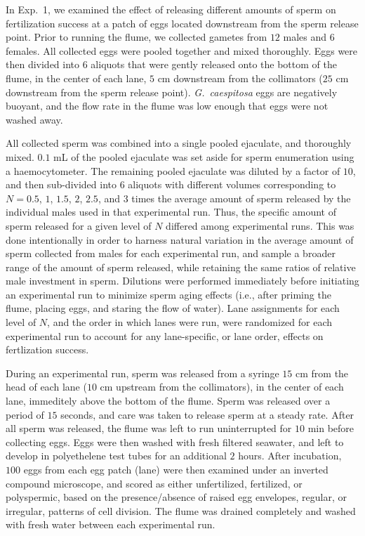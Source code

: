 \documentclass{article}
\begin{document}
	In Exp.~1, we examined the effect of releasing different amounts of sperm on fertilization success at a patch of eggs located downstream from the sperm release point. Prior to running the flume, we collected gametes from $12$ males and $6$ females. All collected eggs were pooled together and mixed thoroughly. Eggs were then divided into $6$ aliquots that were gently released onto the bottom of the flume, in the center of each lane, $5$ cm downstream from the collimators ($25$ cm downstream from the sperm release point). \textit{G.~caespitosa} eggs are negatively buoyant, and the flow rate in the flume was low enough that eggs were not washed away. 

	All collected sperm was combined into a single pooled ejaculate, and thoroughly mixed. $0.1$ mL of the pooled ejaculate was set aside for sperm enumeration using a haemocytometer. The remaining pooled ejaculate was diluted by a factor of $10$, and then sub-divided into $6$ aliquots with different volumes corresponding to $N = 0.5$, $1$, $1.5$, $2$, $2.5$, and $3$ times the average amount of sperm released by the individual males used in that experimental run. Thus, the specific amount of sperm released for a given level of $N$ differed among experimental runs. This was done intentionally in order to harness natural variation in the average amount of sperm collected from males for each experimental run, and sample a broader range of the amount of sperm released, while retaining the same ratios of relative male investment in sperm. Dilutions were performed immediately before initiating an experimental run to minimize sperm aging effects (i.e., after priming the flume, placing eggs, and staring the flow of water). Lane assignments for each level of $N$, and the order in which lanes were run, were randomized for each experimental run to account for any lane-specific, or lane order, effects on fertlization success.

	During an experimental run, sperm was released from a syringe $15$ cm from the head of each lane ($10$ cm upstream from the collimators), in the center of each lane, immeditely above the bottom of the flume. Sperm was released over a period of $15$ seconds, and care was taken to release sperm at a steady rate. After all sperm was released, the flume was left to run uninterrupted for $10$ min before collecting eggs. Eggs were then washed with fresh filtered seawater, and left to develop in polyethelene test tubes for an additional $2$ hours. After incubation, $100$ eggs from each egg patch (lane) were then examined under an inverted compound microscope, and scored as either unfertilized, fertilized, or polyspermic, based on the presence/absence of raised egg envelopes, regular, or irregular, patterns of cell division. The flume was drained completely and washed with fresh water between each experimental run.
\end{document}
